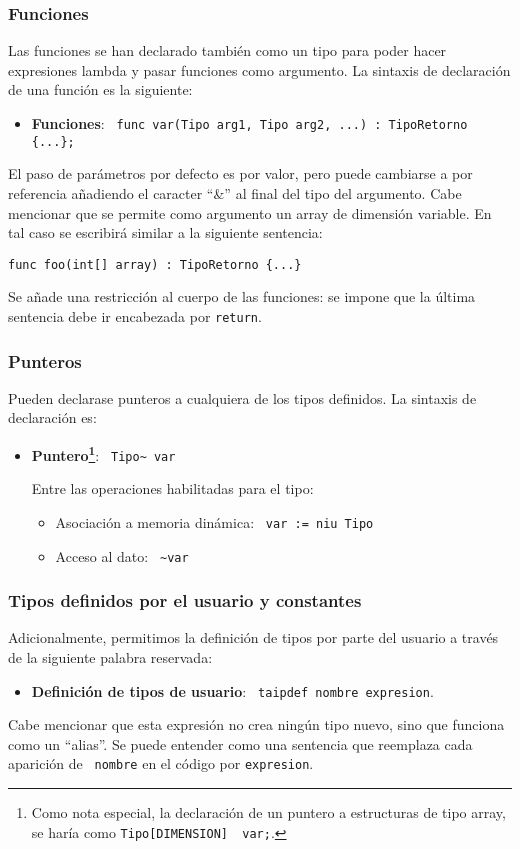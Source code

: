 \documentclass[10pt,a4paper]{article}
\begin{document}
\subsubsection{Funciones}
Las funciones se han declarado también como un tipo para poder hacer expresiones lambda y pasar funciones como argumento. La sintaxis de declaración de una función es la siguiente:
\begin{itemize}
    \item \textbf{Funciones}: \texttt{\color{blue} func var(Tipo arg1, Tipo arg2, ...) : TipoRetorno \{...\};}
\end{itemize}
El paso de parámetros por defecto es por valor, pero puede cambiarse a por referencia añadiendo el caracter ``\&'' al final del tipo del argumento. Cabe mencionar que se permite como argumento un array de dimensión variable. En tal caso se 
escribirá similar a la siguiente sentencia: 
\begin{center}
    \texttt{\color{blue}func foo(int[] array) : TipoRetorno \{...\}}
\end{center}

Se añade una restricción al cuerpo de las funciones: se impone que la última sentencia debe ir encabezada por \texttt{\color{blue}return}.

\subsubsection{Punteros}
Pueden declarase punteros a cualquiera de los tipos definidos. La sintaxis de declaración es:
\begin{itemize}
    \item \textbf{Puntero\footnote{Como nota especial, la declaración de un puntero a estructuras de tipo array, se haría como \texttt{Tipo[DIMENSION]~ var;}.}}: \texttt{\color{blue} Tipo\~{} var}
    
    Entre las operaciones habilitadas para el tipo:
    \begin{itemize}
        \item Asociación a memoria dinámica: \texttt{\color{blue} var := niu Tipo}
        \item Acceso al dato: \texttt{\color{blue} \~{}var}
    \end{itemize}
\end{itemize}

\subsubsection{Tipos definidos por el usuario y constantes}
Adicionalmente, permitimos la definición de tipos por parte del usuario a través de la siguiente palabra reservada:
\begin{itemize}
    \item \textbf{Definición de tipos de usuario}: \texttt{\color{blue} taipdef nombre expresion}.
\end{itemize}
Cabe mencionar que esta expresión no crea ningún tipo nuevo, sino que funciona como un ``alias''. Se puede entender como una sentencia que reemplaza cada aparición de \texttt{\color{blue} nombre} en el código por \texttt{\color{blue}expresion}.
\end{document}
